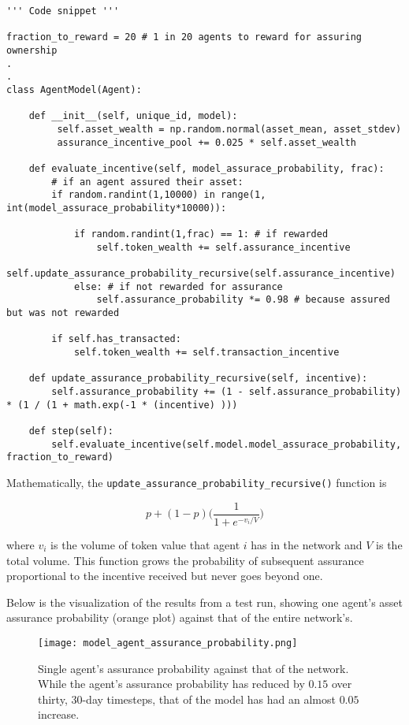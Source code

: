 \documentclass{article}
\begin{document}
\begin{lstlisting}
''' Code snippet '''

fraction_to_reward = 20 # 1 in 20 agents to reward for assuring ownership
.
.
class AgentModel(Agent):

    def __init__(self, unique_id, model):
         self.asset_wealth = np.random.normal(asset_mean, asset_stdev)
         assurance_incentive_pool += 0.025 * self.asset_wealth

    def evaluate_incentive(self, model_assurace_probability, frac):
        # if an agent assured their asset:
        if random.randint(1,10000) in range(1, int(model_assurace_probability*10000)):

            if random.randint(1,frac) == 1: # if rewarded
                self.token_wealth += self.assurance_incentive
                self.update_assurance_probability_recursive(self.assurance_incentive) 
            else: # if not rewarded for assurance
                self.assurance_probability *= 0.98 # because assured but was not rewarded
    
        if self.has_transacted:
            self.token_wealth += self.transaction_incentive

    def update_assurance_probability_recursive(self, incentive):
        self.assurance_probability += (1 - self.assurance_probability) * (1 / (1 + math.exp(-1 * (incentive) )))

    def step(self):
        self.evaluate_incentive(self.model.model_assurace_probability, fraction_to_reward)

\end{lstlisting}

\noindent Mathematically, the \texttt{update\_assurance\_probability\_recursive()} function is

$$p + (1-p)\Big( \frac{1}{1+e^{-v_i/V}} \Big)$$

\noindent where $v_i$ is the volume of token value that agent $i$ has in the network and $V$ is the total volume. This function grows the probability of subsequent assurance proportional to the incentive received but never goes beyond one. 

\noindent Below is the visualization of the results from a test run, showing one agent's asset assurance probability (orange plot) against that of the entire network's.

\begin{figure}[H]
    \centering
    \texttt{[image: model\_agent\_assurance\_probability.png]}
    \caption{Single agent's assurance probability against that of the network. While the agent's assurance probability has reduced by $0.15$ over thirty, 30-day timesteps, that of the model has had an almost $0.05$ increase.}
    \label{fig:CPMM1}
\end{figure}
\end{document}
